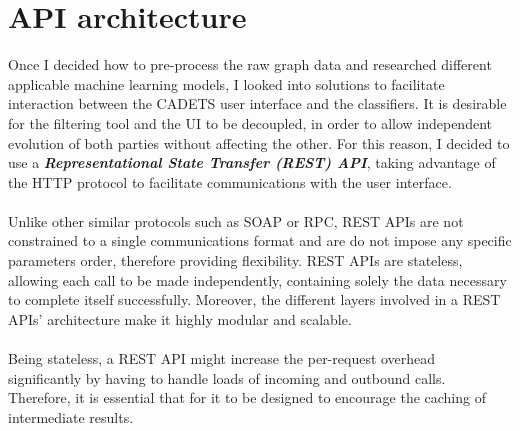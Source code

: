 	\section{API architecture} \label{Section 2.3}
	Once I decided how to pre-process the raw graph data and researched different applicable machine learning models, I looked into solutions to facilitate interaction between the CADETS user interface and the classifiers. It is desirable for the filtering tool and the UI to be decoupled, in order to allow independent evolution of both parties without affecting the other. For this reason, I decided to use a \textit{\textbf{Representational State Transfer (REST) API}}, taking advantage of the HTTP protocol to facilitate communications with the user interface.
	\\ \\
	Unlike other similar protocols such as SOAP or RPC, REST APIs are not constrained to a single communications format and are do not impose any specific parameters order, therefore providing flexibility. REST APIs are stateless, allowing each call to be made independently, containing solely the data necessary to complete itself successfully. Moreover, the different layers involved in a REST APIs' architecture make it highly modular and scalable. 
	\\ \\
	Being stateless, a REST API might increase the per-request overhead significantly by having to handle loads of incoming and outbound calls. Therefore, it is essential that for it to be designed to encourage the caching of intermediate results.
